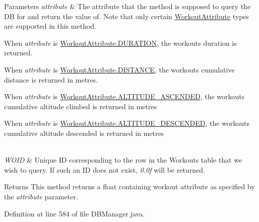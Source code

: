 \begin{DoxyParams}{Parameters}
{\em attribute} & The attribute that the method is supposed to query the DB for and return the value of. Note that only certain \mbox{\hyperlink{enumcom_1_1activitytracker_1_1_workout_attribute}{Workout\+Attribute}} types are supported in this method.
\begin{DoxyItemize}
\item When {\itshape attribute} is \mbox{\hyperlink{enumcom_1_1activitytracker_1_1_workout_attribute_a26bf4a418622c817101083d0152b1cce}{Workout\+Attribute.\+D\+U\+R\+A\+T\+I\+ON}}, the workout\textquotesingle{}s duration is returned.
\item When {\itshape attribute} is \mbox{\hyperlink{enumcom_1_1activitytracker_1_1_workout_attribute_a9df78b53c3bb12809b5f6eff60b88c71}{Workout\+Attribute.\+D\+I\+S\+T\+A\+N\+CE}}, the workout\textquotesingle{}s cumulative distance is returned in metres.
\item When {\itshape attribute} is \mbox{\hyperlink{enumcom_1_1activitytracker_1_1_workout_attribute_a6b40f235f8d0a5b9d751db7c8375dfe1}{Workout\+Attribute.\+A\+L\+T\+I\+T\+U\+D\+E\+\_\+\+A\+S\+C\+E\+N\+D\+ED}}, the workout\textquotesingle{}s cumulative altitude climbed is returned in metres
\item When {\itshape attribute} is \mbox{\hyperlink{enumcom_1_1activitytracker_1_1_workout_attribute_a1aec2c32feb3bab1e6501d3b80079b88}{Workout\+Attribute.\+A\+L\+T\+I\+T\+U\+D\+E\+\_\+\+D\+E\+S\+C\+E\+N\+D\+ED}}, the workout\textquotesingle{}s cumulative altitude descended is returned in metres 
\end{DoxyItemize}\\
\hline
{\em W\+O\+ID} & Unique ID corresponding to the row in the Workouts table that we wish to query. If such an ID does not exist, {\itshape 0.\+0f} will be returned.\\
\hline
\end{DoxyParams}
\begin{DoxyReturn}{Returns}
This method returns a float containing workout attribute as specified by the {\itshape attribute} parameter. 
\end{DoxyReturn}


Definition at line 584 of file D\+B\+Manager.\+java.

\mbox{\label{classcom_1_1activitytracker_1_1_d_b_manager_a41df4600bb5901a26a4ea6a7108a70b9}} 
